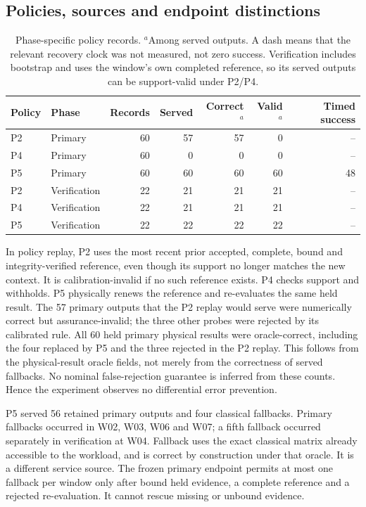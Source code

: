 \documentclass[11pt,a4paper]{article}
\begin{document}
\subsection{Policies, sources and endpoint distinctions}
\begin{table}[htbp]\centering\small
\begin{tabular}{llrrrrr}\toprule
Policy & Phase & Records & Served & Correct$^a$ & Valid$^a$ & Timed success\\\midrule
P2 & Primary & 60 & 57 & 57 & 0 & --\\
P4 & Primary & 60 & 0 & 0 & 0 & --\\
P5 & Primary & 60 & 60 & 60 & 60 & 48\\
P2 & Verification & 22 & 21 & 21 & 21 & --\\
P4 & Verification & 22 & 21 & 21 & 21 & --\\
P5 & Verification & 22 & 22 & 22 & 22 & --\\\bottomrule
\end{tabular}
\caption{Phase-specific policy records. $^a$Among served outputs. A dash means that the relevant recovery clock was not measured, not zero success. Verification includes bootstrap and uses the window's own completed reference, so its served outputs can be support-valid under P2/P4.}\label{tab:policy}
\end{table}
In policy replay, P2 uses the most recent prior accepted, complete, bound and integrity-verified reference, even though its support no longer matches the new context. It is calibration-invalid if no such reference exists. P4 checks support and withholds. P5 physically renews the reference and re-evaluates the same held result. The 57 primary outputs that the P2 replay would serve were numerically correct but assurance-invalid; the three other probes were rejected by its calibrated rule. All 60 held primary physical results were oracle-correct, including the four replaced by P5 and the three rejected in the P2 replay. This follows from the physical-result oracle fields, not merely from the correctness of served fallbacks. No nominal false-rejection guarantee is inferred from these counts. Hence the experiment observes no differential error prevention.

P5 served 56 retained primary outputs and four classical fallbacks. Primary fallbacks occurred in W02, W03, W06 and W07; a fifth fallback occurred separately in verification at W04. Fallback uses the exact classical matrix already accessible to the workload, and is correct by construction under that oracle. It is a different service source. The frozen primary endpoint permits at most one fallback per window only after bound held evidence, a complete reference and a rejected re-evaluation. It cannot rescue missing or unbound evidence.
\end{document}
